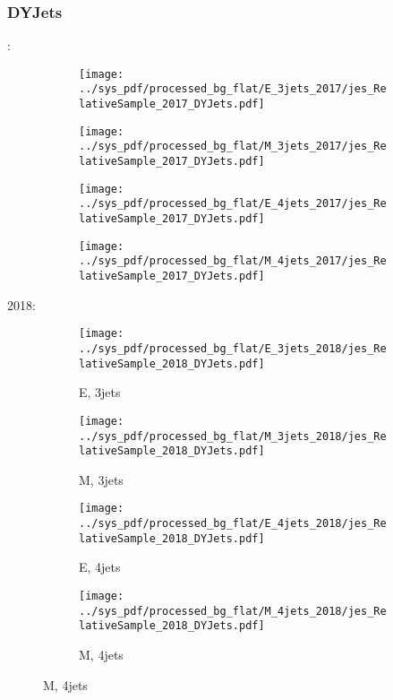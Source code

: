 \documentclass{beamer}
\begin{document}
\begin{frame}
\frametitle{DYJets}
\fontsize{5}{1}:
\begin{figure}
\centering
\begin{subfigure}[b]{0.24\textwidth}
\texttt{[image: ../sys\_pdf/processed\_bg\_flat/E\_3jets\_2017/jes\_RelativeSample\_2017\_DYJets.pdf]}
\end{subfigure}
\begin{subfigure}[b]{0.24\textwidth}
\texttt{[image: ../sys\_pdf/processed\_bg\_flat/M\_3jets\_2017/jes\_RelativeSample\_2017\_DYJets.pdf]}
\end{subfigure}
\begin{subfigure}[b]{0.24\textwidth}
\texttt{[image: ../sys\_pdf/processed\_bg\_flat/E\_4jets\_2017/jes\_RelativeSample\_2017\_DYJets.pdf]}
\end{subfigure}
\begin{subfigure}[b]{0.24\textwidth}
\texttt{[image: ../sys\_pdf/processed\_bg\_flat/M\_4jets\_2017/jes\_RelativeSample\_2017\_DYJets.pdf]}
\end{subfigure}
\end{figure}
2018:
\begin{figure}
\centering
\begin{subfigure}[b]{0.24\textwidth}
\texttt{[image: ../sys\_pdf/processed\_bg\_flat/E\_3jets\_2018/jes\_RelativeSample\_2018\_DYJets.pdf]}
\captionsetup{font=tiny}
\caption{E, 3jets}
\end{subfigure}
\begin{subfigure}[b]{0.24\textwidth}
\texttt{[image: ../sys\_pdf/processed\_bg\_flat/M\_3jets\_2018/jes\_RelativeSample\_2018\_DYJets.pdf]}
\captionsetup{font=tiny}
\caption{M, 3jets}
\end{subfigure}
\begin{subfigure}[b]{0.24\textwidth}
\texttt{[image: ../sys\_pdf/processed\_bg\_flat/E\_4jets\_2018/jes\_RelativeSample\_2018\_DYJets.pdf]}
\captionsetup{font=tiny}
\caption{E, 4jets}
\end{subfigure}
\begin{subfigure}[b]{0.24\textwidth}
\texttt{[image: ../sys\_pdf/processed\_bg\_flat/M\_4jets\_2018/jes\_RelativeSample\_2018\_DYJets.pdf]}
\captionsetup{font=tiny}
\caption{M, 4jets}
\end{subfigure}
\end{figure}
\end{frame}
\end{document}
